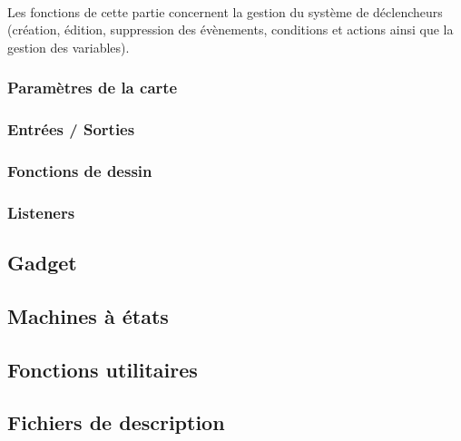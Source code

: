 \documentclass[a4paper]{article}
\begin{document}
\paragraph{}
Les fonctions de cette partie concernent la gestion du système de déclencheurs (création, édition, suppression des évènements, conditions et actions ainsi que la gestion des variables).
\subsubsection{Paramètres de la carte}
\subsubsection{Entrées / Sorties}
\subsubsection{Fonctions de dessin}
\subsubsection{Listeners\label{listeners}}
\subsection{Gadget}
\subsection{Machines à états\label{statemachine}}
\subsection{Fonctions utilitaires}
\subsection{Fichiers de description}
\end{document}
